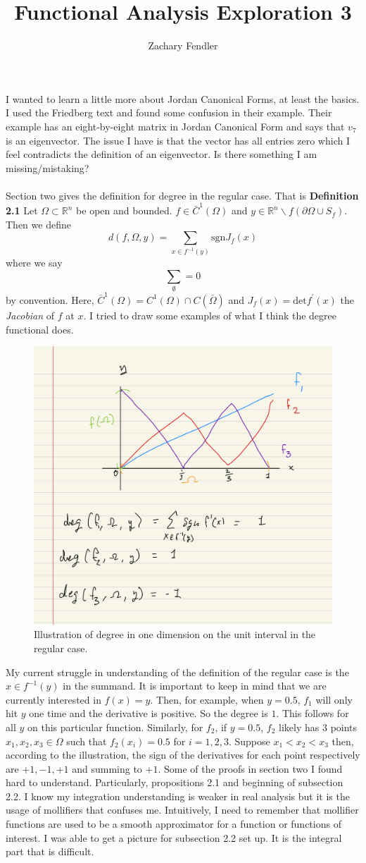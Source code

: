 \documentclass[reqno, 12pt]{article}
\title{Functional Analysis Exploration 3}
\author{Zachary Fendler}
\newcommand{\R}{\mathbb{R}}
\begin{document}
\maketitle
I wanted to learn a little more about Jordan Canonical Forms, at least the basics. I used the Friedberg text and found some confusion in their example. Their example has an eight-by-eight matrix in Jordan Canonical Form and says that $v_7$ is an eigenvector. The issue I have is that the vector has all entries zero which I feel contradicts the definition of an eigenvector. Is there something I am missing/mistaking?
\\\\Section two gives the definition for degree in the regular case. That is
\textbf{Definition 2.1} Let $\Omega \subset \R^n$ be open and bounded. $f \in \bar{C}^1(\Omega)$ and $y \in \R^n\backslash f(\partial\Omega \cup S_f)$. Then we define
$$d(f,\Omega, y) = \sum_{x \in f^{-1}(y)} \text{sgn}J_f(x)$$
where we say $$\sum_{\emptyset} = 0$$ by convention.
Here, $\bar{C}^1(\Omega) = C^1(\Omega) \cap C(\bar{\Omega})$ and $J_f (x) = \text{det}f^{\prime}(x)$ the \textit{Jacobian} of $f$ at $x$.
I tried to draw some examples of what I think the degree functional does.
\begin{figure}[h!]
	\centering
	\includegraphics[width = .5\textwidth]{degree1.jpeg}
	\caption{Illustration of degree in one dimension on the unit interval in the regular case.}
\end{figure}
My current struggle in understanding of the definition of the regular case is the $x \in f^{-1}(y)$ in the summand. It is important to keep in mind that we are currently interested in $f(x) = y$. Then, for example, when $y=0.5$, $f_1$ will only hit $y$ one time and the derivative is positive. So the degree is $1$. This follows for all $y$ on this particular function. Similarly, for $f_2$, if $y=0.5$, $f_2$ likely has $3$ points $x_1,x_2,x_3 \in \Omega$ such that $f_2(x_i) = 0.5$ for $i = 1,2,3$. Suppose $x_1 < x_2 < x_3$ then, according to the illustration, the sign of the derivatives for each point respectively are $+1, - 1, +1$ and summing to $+1$. Some of the proofs in section two I found hard to understand. Particularly, propositions 2.1 and beginning of subsection 2.2. I know my integration understanding is weaker in real analysis but it is the usage of mollifiers that confuses me. Intuitively, I need to remember that mollifier functions are used to be a smooth approximator for a function or functions of interest. I was able to get a picture for subsection 2.2 set up. It is the integral part that is difficult.
\end{document}
